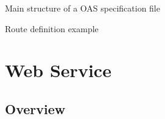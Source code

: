 \documentclass[presentation]{beamer}\mode<presentation>{\usetheme{AMSCesenaPurpleAndGold}}
\begin{document}
\begin{frame}[allowframebreaks]{Main structure of a OAS specification file}
    
\end{frame}

\begin{frame}[allowframebreaks]{Route definition example}
    
\end{frame}

\section{\linda{} Web Service}

\subsection{Overview}
\end{document}
